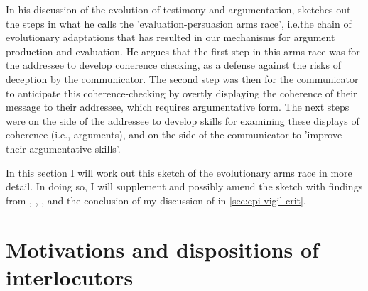 In his discussion of the evolution of testimony and argumentation,\citet{Sperber01} sketches out the steps in what he calls the 'evaluation-persuasion arms race', i.e.\@ the chain of evolutionary adaptations that has resulted in our mechanisms for argument production and evaluation.
He argues that the first step in this arms race was for the addressee to develop coherence checking, as a defense against the risks of deception by the communicator. The second step was then for the communicator to anticipate this coherence-checking by overtly displaying the coherence of their message to their addressee, which requires argumentative form. The next steps were on the side of the addressee to develop skills for examining these displays of coherence (i.e., arguments), and on the side of the communicator to 'improve their argumentative skills'.

In this section I will work out this sketch of the evolutionary arms race in more detail. In doing so, I will supplement and possibly amend the sketch with findings from \citet{Sperber10}, \citet{MS11}, \citet{Reboul17}, and the conclusion of my discussion of \citet{Michaelian13} in \cref{sec:epi-vigil-crit}.

\section{Motivations and dispositions of interlocutors}

